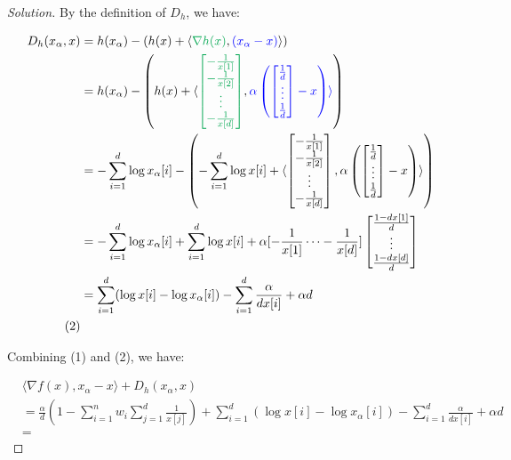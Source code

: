 \documentclass{article}
\newenvironment{solution}
  {\renewcommand\qedsymbol{$\blacksquare$}\begin{proof}[Solution]}
  {\end{proof}}
\begin{document}
\begin{solution}
By the definition of $D_h$, we have:

\begin{align*}
    D_h(x_\alpha, x) 
    &= h(x_\alpha) - \left(h(x) + \langle \textcolor{Green}{\nabla h(x)}, \textcolor{blue}{(x_\alpha - x)} \rangle \right) \\
    &= h(x_\alpha) - \left(h(x) + \langle
        \textcolor{Green}{\begin{bmatrix}
        -\frac{1}{x[1]} \\
        -\frac{1}{x[2]} \\
        \vdots \\
        -\frac{1}{x[d]}
        \end{bmatrix}}, 
    \textcolor{blue}{\alpha \left( \begin{bmatrix}
        \frac{1}{d} \\
        \vdots \\
        \frac{1}{d}
    \end{bmatrix} - x \right) \rangle} \right) \\
    &= -\sum_{i=1}^d \log x_\alpha[i] - \left( -\sum_{i=1}^d \log x[i] + \langle 
    \begin{bmatrix}
        -\frac{1}{x[1]} \\
        -\frac{1}{x[2]} \\
        \vdots \\
        -\frac{1}{x[d]}
    \end{bmatrix}, \alpha \left( \begin{bmatrix}
        \frac{1}{d} \\
        \vdots \\
        \frac{1}{d}
    \end{bmatrix} - x \right) \rangle \right) \\
    &= -\sum_{i=1}^d \log x_\alpha[i] + \sum_{i=1}^d \log x[i] + \alpha [-\frac{1}{x[1]} \cdots -\frac{1}{x[d]}]
    \begin{bmatrix}
        \frac{1 - dx[1]}{d} \\
        \vdots \\
        \frac{1 - dx[d]}{d}
    \end{bmatrix} \\
    &= \sum_{i = 1}^d (\log x[i] - \log x_\alpha[i]) - \sum_{i = 1}^d \frac{\alpha}{d x[i]} + \alpha d \\
    \tag{2}
\end{align*}

Combining (1) and (2), we have:

\begin{align*}
    &\langle \nabla f(x), x_\alpha - x \rangle + D_h(x_\alpha, x) \\
    &= \frac{\alpha}{d} \left( 1 - \sum_{i = 1}^n w_i \sum_{j = 1}^d \frac{1}{x[j]} \right)
        + \sum_{i = 1}^d (\log x[i] - \log x_\alpha[i]) - \sum_{i = 1}^d \frac{\alpha}{d x[i]} + \alpha d \\
    &= 
\end{align*}
\end{solution}
\end{document}
